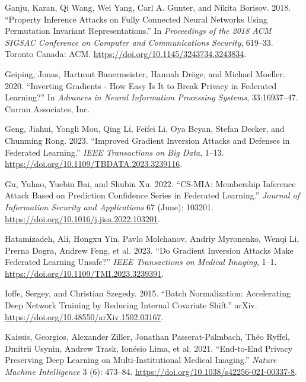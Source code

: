 \documentclass[
  compsoc]{IEEEtran}
\newlength{\cslhangindent}
\newlength{\cslentryspacingunit} %
\newenvironment{CSLReferences}[2] %
 {%
  \setlength{\parindent}{0pt}
  \ifodd #1
  \let\oldpar\par
  \def\par{\hangindent=\cslhangindent\oldpar}
  \fi
  \setlength{\parskip}{#2\cslentryspacingunit}
 }%
 {}
\begin{document}
\begin{CSLReferences}{1}{0}
\leavevmode{}%
Ganju, Karan, Qi Wang, Wei Yang, Carl A. Gunter, and Nikita Borisov.
2018. {``Property {Inference Attacks} on {Fully Connected Neural
Networks} Using {Permutation Invariant Representations}.''} In
\emph{Proceedings of the 2018 {ACM SIGSAC Conference} on {Computer} and
{Communications Security}}, 619--33. {Toronto Canada}: {ACM}.
\url{https://doi.org/10.1145/3243734.3243834}.

\leavevmode{}%
Geiping, Jonas, Hartmut Bauermeister, Hannah Dröge, and Michael Moeller.
2020. {``Inverting {Gradients} - {How} Easy Is It to Break Privacy in
Federated Learning?''} In \emph{Advances in {Neural Information
Processing Systems}}, 33:16937--47. {Curran Associates, Inc.}

\leavevmode{}%
Geng, Jiahui, Yongli Mou, Qing Li, Feifei Li, Oya Beyan, Stefan Decker,
and Chunming Rong. 2023. {``Improved {Gradient Inversion Attacks} and
{Defenses} in {Federated Learning}.''} \emph{IEEE Transactions on Big
Data}, 1--13. \url{https://doi.org/10.1109/TBDATA.2023.3239116}.

\leavevmode{}%
Gu, Yuhao, Yuebin Bai, and Shubin Xu. 2022. {``{CS-MIA}: {Membership}
Inference Attack Based on Prediction Confidence Series in Federated
Learning.''} \emph{Journal of Information Security and Applications} 67
(June): 103201. \url{https://doi.org/10.1016/j.jisa.2022.103201}.

\leavevmode{}%
Hatamizadeh, Ali, Hongxu Yin, Pavlo Molchanov, Andriy Myronenko, Wenqi
Li, Prerna Dogra, Andrew Feng, et al. 2023. {``Do {Gradient Inversion
Attacks Make Federated Learning Unsafe}?''} \emph{IEEE Transactions on
Medical Imaging}, 1--1. \url{https://doi.org/10.1109/TMI.2023.3239391}.

\leavevmode{}%
Ioffe, Sergey, and Christian Szegedy. 2015. {``Batch {Normalization}:
{Accelerating Deep Network Training} by {Reducing Internal Covariate
Shift}.''} {arXiv}. \url{https://doi.org/10.48550/arXiv.1502.03167}.

\leavevmode{}%
Kaissis, Georgios, Alexander Ziller, Jonathan Passerat-Palmbach, Théo
Ryffel, Dmitrii Usynin, Andrew Trask, Ionésio Lima, et al. 2021.
{``End-to-End Privacy Preserving Deep Learning on Multi-Institutional
Medical Imaging.''} \emph{Nature Machine Intelligence} 3 (6): 473--84.
\url{https://doi.org/10.1038/s42256-021-00337-8}.


\end{CSLReferences}
\end{document}
